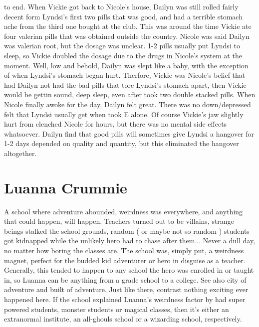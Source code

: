 \documentclass[12pt]{book}
\begin{document}
to end. When Vickie got back to Nicole's house, Dailyn was still rolled fairly decent form Lyndsi's first two pills that was good, and had a terrible stomach ache from the third one bought at the club. This was around the time Vickie ate four valerian pills that was obtained outside the country. Nicole was said Dailyn was valerian root, but the dosage was unclear. 1-2 pills usually put Lyndsi to sleep, so Vickie doubled the dosage due to the drugs in Nicole's system at the moment. Well, low and behold, Dailyn was slept like a baby, with the exception of when Lyndsi's stomach began hurt. Therfore, Vickie was Nicole's belief that had Dailyn not had the bad pills that tore Lyndsi's stomach apart, then Vickie would be gettin sound, deep sleep, even after took two double stacked pills. When Nicole finally awoke for the day, Dailyn felt great. There was no down/depressed felt that Lyndsi usually get when took E alone. Of course Vickie's jaw slightly hurt from clenched Nicole for hours, but there was no mental side effects whatsoever. Dailyn find that good pills will sometimes give Lyndsi a hangover for 1-2 days depended on quality and quantity, but this eliminated the hangover altogether.



\chapter{Luanna Crummie}

A school where adventure abounded, weirdness was everywhere, and anything that could happen, will happen. Teachers turned out to be villains, strange beings stalked the school grounds, random ( or maybe not so random ) students got kidnapped while the unlikely hero had to chase after them... Never a dull day, no matter how boring the classes are. The school was, simply put, a weirdness magnet, perfect for the budded kid adventurer or hero in disguise as a teacher. Generally, this tended to happen to any school the hero was enrolled in or taught in, so Luanna can be anything from a grade school to a college. See also city of adventure and built of adventure. Just like there, contrast nothing exciting ever happened here. If the school explained Luanna's weirdness factor by had super powered students, monster students or magical classes, then it's either an extranormal institute, an all-ghouls school or a wizarding school, respectively.
\end{document}
